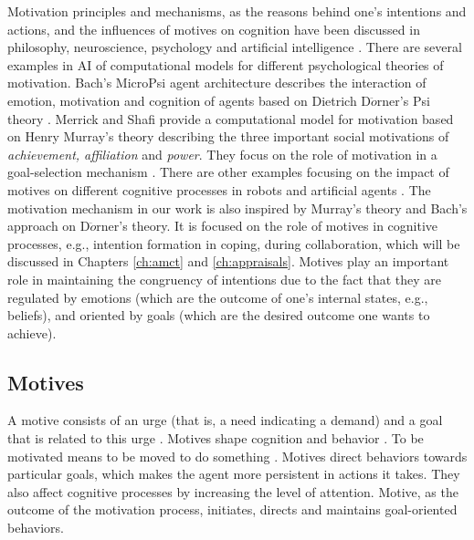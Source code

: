 \documentclass[12pt]{report}
\begin{document}
Motivation principles and mechanisms, as the reasons behind one's intentions and
actions, and the influences of motives on cognition have been discussed in
philosophy, neuroscience, psychology and artificial intelligence
\cite{bach:motivaitional-system-ai, berridge:motivation-concepts-neuroscience,
brody:motivation-goal-action, simon:motivation-emotion-cognition,
sloman:motivation}. There are several examples in AI of computational models for
different psychological theories of motivation. Bach's MicroPsi agent
architecture describes the interaction of emotion, motivation and cognition of
agents based on Dietrich D$\ddot{o}$rner's Psi theory
\cite{bach:micropsi-agent-architecture, bach:psi, bach:motivaitional-system-ai,
bach:next-generation-micropsi}. Merrick and Shafi provide a computational model
for motivation based on Henry Murray's theory
\cite{murray:personality-exploration} describing the three important social
motivations of \textit{achievement, affiliation} and \textit{power}. They focus
on the role of motivation in a goal-selection mechanism
\cite{merrick:acheievement-affiliation-power}. There are other examples focusing
on the impact of motives on different cognitive processes in robots and
artificial agents \cite{breazeal:motivation-regulating-hri,
dolores:socially-emotional, deSevin:motivational-model-agent,
sellers:comprehensive-emotion-theory, velasquez:emotions-motivations-agents,
wright:implementation-agent-architecture}. The motivation mechanism in our work
is also inspired by Murray's theory and Bach's approach on D$\ddot{o}$rner's
theory. It is focused on the role of motives in cognitive processes, e.g.,
intention formation in coping, during collaboration, which will be discussed in
Chapters \ref{ch:amct} and \ref{ch:appraisals}. Motives play an important role
in maintaining the congruency of intentions due to the fact that they are
regulated by emotions (which are the outcome of one's internal states, e.g.,
beliefs), and oriented by goals (which are the desired outcome one wants to
achieve).

\subsection{Motives}

A motive consists of an urge (that is, a need indicating a demand) and a goal
that is related to this urge \cite{bach:psi}. Motives shape cognition and
behavior \cite{schultheiss:implicit-motive}. To be motivated means to be moved
to do something \cite{ryan:intrinsic-extrinsic-motivations}. Motives direct
behaviors towards particular goals, which makes the agent more persistent in
actions it takes. They also affect cognitive processes by increasing the level
of attention. Motive, as the outcome of the motivation process, initiates,
directs and maintains goal-oriented behaviors.
\end{document}
